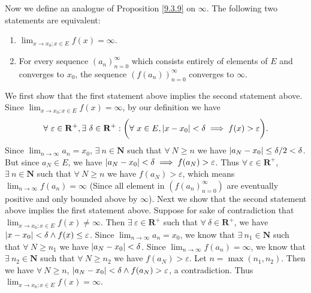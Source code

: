 \begin{definition}
    Now we define an analogue of Proposition \ref{9.3.9} on \(\infty\).
    The following two statements are equivalent:
    \begin{enumerate}
        \item \(\lim_{x \to x_0 ; x \in E} f(x) = \infty\).
        \item For every sequence \((a_n)_{n = 0}^\infty\) which consists entirely of elements of \(E\) and converges to \(x_0\), the sequence \((f(a_n))_{n = 0}^\infty\) converges to \(\infty\).
    \end{enumerate}
    We first show that the first statement above implies the second statement above.
    Since \(\lim_{x \to x_0 ; x \in E} f(x) = \infty\), by our definition we have
    \[
        \forall\ \varepsilon \in \mathbf{R}^+, \exists\ \delta \in \mathbf{R}^+ : \bigg(\forall\ x \in E, \abs*{x - x_0} < \delta \implies f(x) > \varepsilon\bigg).
    \]
    Since \(\lim_{n \to \infty} a_n = x_0\), \(\exists\ n \in \mathbf{N}\) such that \(\forall\ N \geq n\) we have \(\abs*{a_N - x_0} \leq \delta / 2 < \delta\).
    But since \(a_N \in E\), we have \(\abs*{a_N - x_0} < \delta \implies f(a_N) > \varepsilon\).
    Thus \(\forall\ \varepsilon \in \mathbf{R}^+\), \(\exists\ n \in \mathbf{N}\) such that \(\forall\ N \geq n\) we have \(f(a_N) > \varepsilon\), which means \(\lim_{n \to \infty} f(a_n) = \infty\)
    (Since all element in \((f(a_n)_{n = 0}^\infty)\) are eventually positive and only bounded above by \(\infty\)).
    Next we show that the second statement above implies the first statement above.
    Suppose for sake of contradiction that \(\lim_{x \to x_0 ; x \in E} f(x) \neq \infty\).
    Then \(\exists\ \varepsilon \in \mathbf{R}^+\) such that \(\forall\ \delta \in \mathbf{R}^+\), we have \(\abs*{x - x_0} < \delta \land f(x) \leq \varepsilon\).
    Since \(\lim_{n \to \infty} a_n = x_0\), we know that \(\exists\ n_1 \in \mathbf{N}\) such that \(\forall\ N \geq n_1\) we have \(\abs*{a_N - x_0} < \delta\).
    Since \(\lim_{n \to \infty} f(a_n) = \infty\), we know that \(\exists\ n_2 \in \mathbf{N}\) such that \(\forall\ N \geq n_2\) we have \(f(a_N) > \varepsilon\).
    Let \(n = \max(n_1, n_2)\).
    Then we have \(\forall\ N \geq n\), \(\abs*{a_N - x_0} < \delta \land f(a_N) > \varepsilon\), a contradiction.
    Thus \(\lim_{x \to x_0 ; x \in E} f(x) = \infty\).


\end{definition}
